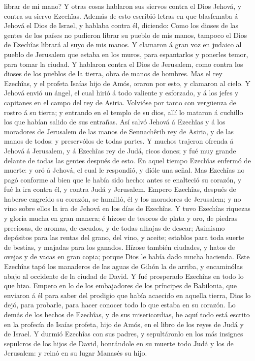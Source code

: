 librar de mi mano?  Y otras cosas hablaron sus siervos
contra el Dios Jehová, y contra su siervo Ezechîas.  Además
de esto escribió letras en que blasfemaba á Jehová el Dios de Israel, y
hablaba contra él, diciendo: Como los dioses de las gentes de los países
no pudieron librar su pueblo de mis manos, tampoco el Dios de Ezechîas
librará al suyo de mis manos.  Y clamaron á gran voz en
judaico al pueblo de Jerusalem que estaba en los muros, para espantarlos
y ponerles temor, para tomar la ciudad.  Y hablaron contra
el Dios de Jerusalem, como contra los dioses de los pueblos de la
tierra, obra de manos de hombres.  Mas el rey Ezechîas, y
el profeta Isaías hijo de Amós, oraron por esto, y clamaron al cielo.
 Y Jehová envió un ángel, el cual hirió á todo valiente y
esforzado, y á los jefes y capitanes en el campo del rey de Asiria.
Volvióse por tanto con vergüenza de rostro á su tierra; y entrando en el
templo de su dios, allí lo mataron á cuchillo los que habían salido de
sus entrañas.  Así salvó Jehová á Ezechîas y á los
moradores de Jerusalem de las manos de Sennachêrib rey de Asiria, y de
las manos de todos: y preservólos de todas partes.  Y
muchos trajeron ofrenda á Jehová á Jerusalem, y á Ezechîas rey de Judá,
ricos dones; y fué muy grande delante de todas las gentes después de
esto.  En aquel tiempo Ezechîas enfermó de muerte: y oró á
Jehová, el cual le respondió, y dióle una señal.  Mas
Ezechîas no pagó conforme al bien que le había sido hecho: antes se
enalteció su corazón, y fué la ira contra él, y contra Judá y Jerusalem.
 Empero Ezechîas, después de haberse engreído su corazón,
se humilló, él y los moradores de Jerusalem; y no vino sobre ellos la
ira de Jehová en los días de Ezechîas.  Y tuvo Ezechîas
riquezas y gloria mucha en gran manera; é hízose de tesoros de plata y
oro, de piedras preciosas, de aromas, de escudos, y de todas alhajas de
desear;  Asimismo depósitos para las rentas del grano, del
vino, y aceite; establos para toda suerte de bestias, y majadas para los
ganados.  Hízose también ciudades, y hatos de ovejas y de
vacas en gran copia; porque Dios le había dado mucha hacienda.
 Este Ezechîas tapó los manaderos de las aguas de Gihón la
de arriba, y encaminólas abajo al occidente de la ciudad de David. Y fué
prosperado Ezechîas en todo lo que hizo.  Empero en lo de
los embajadores de los príncipes de Babilonia, que enviaron á él para
saber del prodigio que había acaecido en aquella tierra, Dios lo dejó,
para probarle, para hacer conocer todo lo que estaba en su corazón.
 Lo demás de los hechos de Ezechîas, y de sus
misericordias, he aquí todo está escrito en la profecía de Isaías
profeta, hijo de Amós, en el libro de los reyes de Judá y de Israel.
 Y durmió Ezechîas con sus padres, y sepultáronlo en los
más insignes sepulcros de los hijos de David, honrándole en su muerte
todo Judá y los de Jerusalem: y reinó en su lugar Manasés su hijo.

